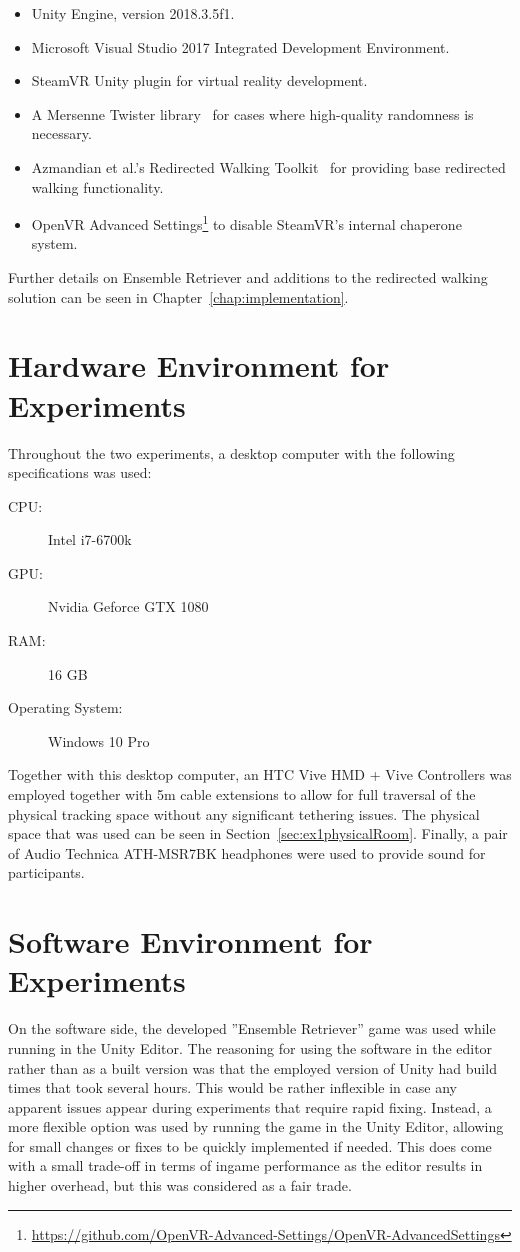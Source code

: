 \begin{itemize}
    \item Unity Engine, version 2018.3.5f1.
    \item Microsoft Visual Studio 2017 Integrated Development Environment.
    \item SteamVR Unity plugin for virtual reality development.
    \item A Mersenne Twister library~\cite{MersenneTwisterLibraryLink} for cases where high-quality randomness is necessary.
    \item Azmandian et al.'s Redirected Walking Toolkit~\cite{azmandian2016redirected} for providing base redirected walking functionality.
    \item OpenVR Advanced Settings\footnote{\url{https://github.com/OpenVR-Advanced-Settings/OpenVR-AdvancedSettings}} to disable SteamVR's internal chaperone system.
\end{itemize}

Further details on Ensemble Retriever and additions to the redirected walking solution can be seen in Chapter~\ref{chap:implementation}.

\section{Hardware Environment for Experiments}
Throughout the two experiments, a desktop computer with the following specifications was used:
\begin{description}
   \item[CPU:] Intel i7-6700k
   \item[GPU:] Nvidia Geforce GTX 1080
   \item[RAM:] 16 GB
   \item[Operating System:] Windows 10 Pro
\end{description}

Together with this desktop computer, an HTC Vive HMD + Vive Controllers was employed together with 5m cable extensions to allow for full traversal of the physical tracking space without any significant tethering issues. The physical space that was used can be seen in Section~\ref{sec:ex1physicalRoom}. Finally, a pair of Audio Technica ATH-MSR7BK headphones were used to provide sound for participants. 

\section{Software Environment for Experiments}
On the software side, the developed ''Ensemble Retriever'' game was used while running in the Unity Editor. The reasoning for using the software in the editor rather than as a built version was that the employed version of Unity had build times that took several hours. This would be rather inflexible in case any apparent issues appear during experiments that require rapid fixing. Instead, a more flexible option was used by running the game in the Unity Editor, allowing for small changes or fixes to be quickly implemented if needed. This does come with a small trade-off in terms of ingame performance as the editor results in higher overhead, but this was considered as a fair trade. 